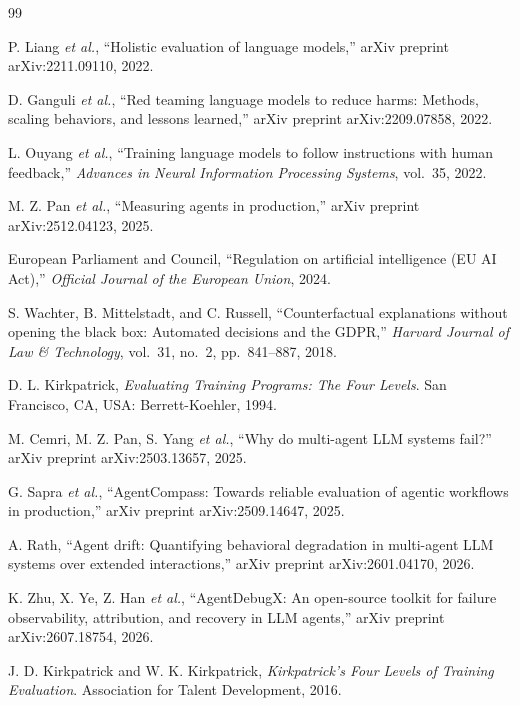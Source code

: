 \documentclass[conference]{IEEEtran}
\begin{document}
\begin{thebibliography}{99}
\scriptsize

P. Liang \emph{et al.}, ``Holistic evaluation of language models,'' arXiv
preprint arXiv:2211.09110, 2022.

D. Ganguli \emph{et al.}, ``Red teaming language models to reduce harms:
Methods, scaling behaviors, and lessons learned,'' arXiv preprint
arXiv:2209.07858, 2022.

L. Ouyang \emph{et al.}, ``Training language models to follow instructions with
human feedback,'' \emph{Advances in Neural Information Processing Systems},
vol.~35, 2022.

M. Z. Pan \emph{et al.}, ``Measuring agents in production,'' arXiv preprint
arXiv:2512.04123, 2025.

European Parliament and Council, ``Regulation on artificial intelligence (EU AI
Act),'' \emph{Official Journal of the European Union}, 2024.

S. Wachter, B. Mittelstadt, and C. Russell, ``Counterfactual explanations
without opening the black box: Automated decisions and the GDPR,'' \emph{Harvard
Journal of Law \& Technology}, vol.~31, no.~2, pp.~841--887, 2018.

D. L. Kirkpatrick, \emph{Evaluating Training Programs: The Four Levels}. San
Francisco, CA, USA: Berrett-Koehler, 1994.

M. Cemri, M. Z. Pan, S. Yang \emph{et al.}, ``Why do multi-agent LLM systems
fail?'' arXiv preprint arXiv:2503.13657, 2025.

G. Sapra \emph{et al.}, ``AgentCompass: Towards reliable evaluation of agentic
workflows in production,'' arXiv preprint arXiv:2509.14647, 2025.

A. Rath, ``Agent drift: Quantifying behavioral degradation in multi-agent LLM
systems over extended interactions,'' arXiv preprint arXiv:2601.04170, 2026.

K. Zhu, X. Ye, Z. Han \emph{et al.}, ``AgentDebugX: An open-source toolkit for
failure observability, attribution, and recovery in LLM agents,'' arXiv
preprint arXiv:2607.18754, 2026.

J. D. Kirkpatrick and W. K. Kirkpatrick, \emph{Kirkpatrick's Four Levels of
Training Evaluation}. Association for Talent Development, 2016.


\end{thebibliography}
\end{document}
